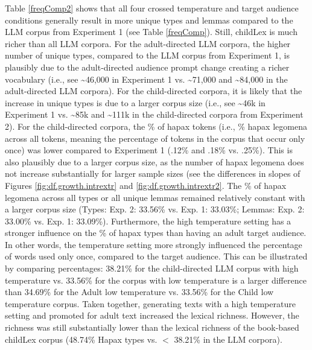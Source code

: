 \documentclass[doc, a4paper]{apa7}
\begin{document}
Table \ref{freqComp2} shows that all four crossed temperature and target audience conditions generally result in more unique types and lemmas compared to the LLM corpus from Experiment 1 (see Table \ref{freqComp}). Still, childLex is much richer than all LLM corpora. For the adult-directed LLM corpora, the higher number of unique types, compared to the LLM corpus from Experiment 1, is plausibly due to the adult-directed audience prompt change creating a richer vocabulary (i.e., see \textasciitilde 46,000 in Experiment 1 vs. \textasciitilde 71,000 and \textasciitilde 84,000 in the adult-directed LLM corpora). For the child-directed corpora, it is likely that the increase in unique types is due to a larger corpus size (i.e., see \textasciitilde 46k in Experiment 1 vs. \textasciitilde 85k and \textasciitilde 111k in the child-directed corpora from Experiment 2). For the child-directed corpora, the \% of hapax tokens (i.e., \% hapax legomena across all tokens, meaning the percentage of tokens in the corpus that occur only once) was lower compared to Experiment 1 (.12\% and .18\% vs. .25\%). This is also plausibly due to a larger corpus size, as the number of hapax legomena does not increase substantially for larger sample sizes (see the differences in slopes of Figures \ref{fig:df.growth.intrextr} and \ref{fig:df.growth.intrextr2}. The \% of hapax legomena across all types or all unique lemmas remained relatively constant with a larger corpus size (Types: Exp. 2: 33.56\% vs. Exp. 1: 33.03\%; Lemmas: Exp. 2: 33.00\% vs. Exp. 1: 33.09\%). Furthermore, the high temperature setting has a stronger influence on the \% of hapax types than having an adult target audience. In other words, the temperature setting more strongly influenced the percentage of words used only once, compared to the target audience. This can be illustrated by comparing percentages: 38.21\% for the child-directed LLM corpus with high temperature vs. 33.56\% for the corpus with low temperature is a larger difference than 34.69\% for the Adult low temperature vs. 33.56\% for the Child low temperature corpus. Taken together, generating texts with a high temperature setting and promoted for adult text increased the lexical richness. However, the richness was still substantially lower than the lexical richness of the book-based childLex corpus (48.74\% Hapax types vs. $<$ 38.21\% in the LLM corpora). 
\end{document}
